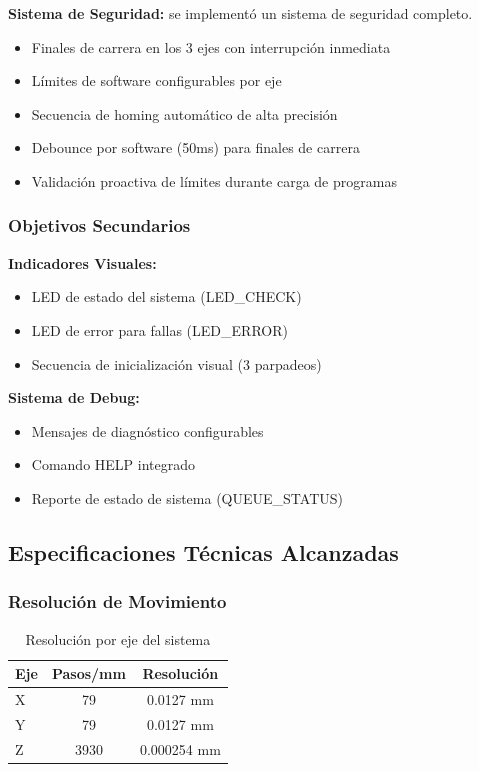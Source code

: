 \documentclass[12pt]{article}
\begin{document}
\textbf{Sistema de Seguridad:} se implementó un sistema de seguridad completo.
\begin{itemize}
    \item Finales de carrera en los 3 ejes con interrupción inmediata
    \item Límites de software configurables por eje
    \item Secuencia de homing automático de alta precisión
    \item Debounce por software (50ms) para finales de carrera
    \item Validación proactiva de límites durante carga de programas
\end{itemize}

\subsubsection{Objetivos Secundarios}

\textbf{Indicadores Visuales:}
\begin{itemize}
    \item LED de estado del sistema (LED\_CHECK)
    \item LED de error para fallas (LED\_ERROR)
    \item Secuencia de inicialización visual (3 parpadeos)
\end{itemize}

\textbf{Sistema de Debug:}
\begin{itemize}
    \item Mensajes de diagnóstico configurables
    \item Comando HELP integrado
    \item Reporte de estado de sistema (QUEUE\_STATUS)
\end{itemize}

\subsection{Especificaciones Técnicas Alcanzadas}

\subsubsection{Resolución de Movimiento}

\begin{table}[h]
\centering
\begin{tabular}{|l|c|c|}
\hline
\textbf{Eje} & \textbf{Pasos/mm} & \textbf{Resolución} \\
\hline
X & 79 & 0.0127 mm \\
Y & 79 & 0.0127 mm \\
Z & 3930 & 0.000254 mm \\
\hline
\end{tabular}
\caption{Resolución por eje del sistema}
\end{table}
\end{document}
